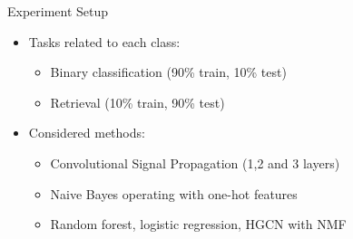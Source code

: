 \documentclass{beamer}
\newlength{\colwidth}
\begin{document}
\begin{frame}[fragile,t]
\begin{columns}[t]
\begin{column}{\colwidth}
    \begin{block}{Experiment Setup}
    \begin{itemize}
        \item Tasks related to each class:
        \begin{itemize}
            \item Binary classification (90\% train, 10\% test)
            \item Retrieval (10\% train, 90\% test)
        \end{itemize}
        \item Considered methods:
        \begin{itemize}
            \item Convolutional Signal Propagation (1,2 and 3 layers)
            \item Naive Bayes operating with one-hot features
            \item Random forest, logistic regression, HGCN with NMF
        \end{itemize}
    \end{itemize}
    \end{block}
    

\end{column}
\end{columns}
\end{frame}
\end{document}

